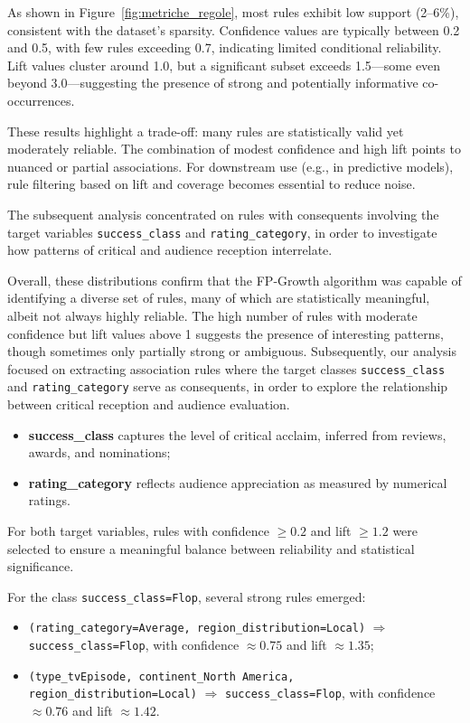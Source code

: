 \documentclass[10pt]{article}
\begin{document}
As shown in Figure~\ref{fig:metriche_regole}, most rules exhibit low support (2–6\%), consistent with the dataset's sparsity. Confidence values are typically between 0.2 and 0.5, with few rules exceeding 0.7, indicating limited conditional reliability. Lift values cluster around 1.0, but a significant subset exceeds 1.5—some even beyond 3.0—suggesting the presence of strong and potentially informative co-occurrences.

These results highlight a trade-off: many rules are statistically valid yet moderately reliable. The combination of modest confidence and high lift points to nuanced or partial associations. For downstream use (e.g., in predictive models), rule filtering based on lift and coverage becomes essential to reduce noise.

The subsequent analysis concentrated on rules with consequents involving the target variables \texttt{success\_class} and \texttt{rating\_category}, in order to investigate how patterns of critical and audience reception interrelate.

Overall, these distributions confirm that the FP-Growth algorithm was capable of identifying a diverse set of rules, many of which are statistically meaningful, albeit not always highly reliable. The high number of rules with moderate confidence but lift values above 1 suggests the presence of interesting patterns, though sometimes only partially strong or ambiguous. 
Subsequently, our analysis focused on extracting association rules where the target classes \texttt{success\_class} and \texttt{rating\_category} serve as consequents, in order to explore the relationship between critical reception and audience evaluation.

\begin{itemize}
    \item \textbf{success\_class} captures the level of critical acclaim, inferred from reviews, awards, and nominations;
    \item \textbf{rating\_category} reflects audience appreciation as measured by numerical ratings.
\end{itemize}

For both target variables, rules with confidence $\geq 0.2$ and lift $\geq 1.2$ were selected to ensure a meaningful balance between reliability and statistical significance.

For the class \texttt{success\_class=Flop}, several strong rules emerged:
\begin{itemize}
    \item \texttt{(rating\_category=Average, region\_distribution=Local)} $\Rightarrow$ \texttt{success\_class=Flop}, with confidence $\approx 0.75$ and lift $\approx 1.35$;
    \item \texttt{(type\_tvEpisode, continent\_North America, region\_distribution=Local)} $\Rightarrow$ \texttt{success\_class=Flop}, with confidence $\approx 0.76$ and lift $\approx 1.42$.
\end{itemize}
\end{document}
